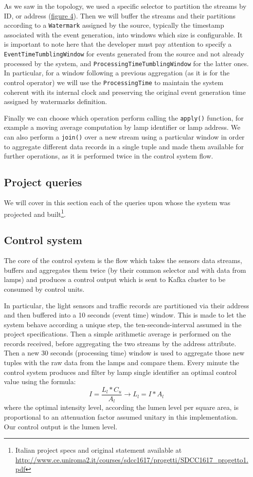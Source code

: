 As we saw in the topology, we used a specific selector to partition the streams by ID, or address (\hyperref[fig:ember_operation_flow]{figure 4}).  Then we will buffer the streams and their partitions according to a \texttt{Watermark} assigned by the source, typically the timestamp associated with the event generation, into windows which size is configurable. It is important to note here that the developer must pay attention to specify a \texttt{EventTimeTumblingWindow} for events generated from the source and not already processed by the system, and \texttt{ProcessingTimeTumblingWindow} for the latter ones. In particular, for a window following a previous aggregation (as it is for the control operator) we will use the \texttt{ProcessingTime} to maintain the system coherent with its internal clock and preserving the original event generation time assigned by watermarks definition.

Finally we can choose which operation perform calling the \texttt{apply()} function, for example a moving average computation by lamp identifier or lamp address. We can also perform a \texttt{join()} over a new stream using a particular window in order to aggregate different data records in a single tuple and made them available for further operations, as it is performed twice in the control system flow.

\subsection{Project queries}
We will cover in this section each of the queries upon whose the system was projected and built\footnote{Italian project specs and original statement available at \url{http://www.ce.uniroma2.it/courses/sdcc1617/progetti/SDCC1617_progetto1.pdf}}. 

\subsection*{Control system}
The core of the control system is the flow which takes the sensors data streams, buffers and aggregates them twice (by their common selector and with data from lamps) and produces a control output which is sent to Kafka cluster to be consumed by control units.

In particular, the light sensors and traffic records are partitioned via their address and then buffered into a 10 seconds (event time) window. This is made to let the system behave according a unique step, the ten-seconds-interval assumed in the project specifications. Then a simple arithmetic average is performed on the records received, before aggregating the two streams by the address attribute. Then a new 30 seconds (processing time) window is used to aggregate those new tuples with the raw data from the lamps and compare them. Every minute the control system produces and filter by lamp single identifier an optimal control value using the formula:
	$$I = \frac{L_l*C_u}{A_l} \rightarrow L_l = I * A_l$$
where the optimal intensity level, according the lumen level per square area, is proportional to an attenuation factor assumed unitary in this implementation. Our control output is the lumen level.

